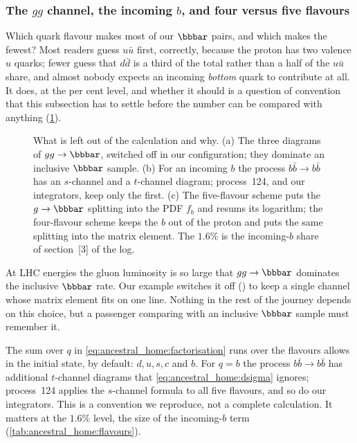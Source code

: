 \subsubsection{The \texorpdfstring{$gg$}{gg} channel, the incoming \texorpdfstring{$b$}{b}, and four versus five flavours}
\label{sec:ancestral_home:gg_and_flavours}

Which quark flavour makes most of our $\bbbar$ pairs, and which makes the
fewest? Most readers guess $u\bar u$ first, correctly, because the proton has
two valence $u$ quarks; fewer guess that $d\bar d$ is a third of the total
rather than a half of the $u\bar u$ share, and almost nobody expects an
incoming \emph{bottom} quark to contribute at all. It does, at the per cent
level, and whether it should is a question of convention that this
subsection has to settle before the number can be compared with anything
(\cref{fig:ancestral_home:feynman_gg}).

\begin{figure}[htbp]\centering
\resizebox{\textwidth}{!}{}
\caption[What is left out: the $gg$ channel, the $t$-channel $b\bar b$ diagram, and the two flavour schemes]{What is left out of the calculation and why. (a) The three diagrams of $gg\to\bbbar$, switched off in our configuration; they dominate an inclusive $\bbbar$ sample. (b) For an incoming $b$ the process $b\bar b\to b\bar b$ has an $s$-channel and a $t$-channel diagram; \PYTHIA process~124, and our integrators, keep only the first. (c) The five-flavour scheme puts the $g\to\bbbar$ splitting into the PDF $f_b$ and resums its logarithm; the four-flavour scheme keeps the $b$ out of the proton and puts the same splitting into the matrix element. The $1.6\%$ is the incoming-$b$ share of section~[3] of the  log.}
\label{fig:ancestral_home:feynman_gg}
\end{figure}

At LHC energies the gluon luminosity is so large that $gg\to\bbbar$ dominates
the inclusive $\bbbar$ rate. Our example switches it off
() to keep a single channel whose matrix element
fits on one line. Nothing in the rest of the journey depends on this choice,
but a passenger comparing with an inclusive $\bbbar$ sample must remember it.

The sum over $q$ in \cref{eq:ancestral_home:factorisation} runs over the
flavours \PYTHIA allows in the initial state, 
by default: $d,u,s,c$ and $b$. For $q=b$ the process $b\bar b\to b\bar b$ has
additional $t$-channel diagrams that \cref{eq:ancestral_home:dsigma} ignores;
\PYTHIA process~124 applies the $s$-channel formula to all five flavours, and
so do our integrators. This is a convention we reproduce, not a complete
calculation. It matters at the $1.6\%$ level, the size of the incoming-$b$
term (\cref{tab:ancestral_home:flavours}).

